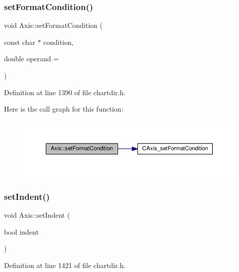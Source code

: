 \subsubsection{\texorpdfstring{set\+Format\+Condition()}{setFormatCondition()}}
{\footnotesize\ttfamily void Axis\+::set\+Format\+Condition (\begin{DoxyParamCaption}\item[{const char $\ast$}]{condition,  }\item[{double}]{operand = {} }\end{DoxyParamCaption})\hspace{0.3cm}{\ttfamily [inline]}}



Definition at line 1390 of file chartdir.\+h.

Here is the call graph for this function\+:
\nopagebreak
\begin{figure}[H]
\begin{center}
\leavevmode
\includegraphics[width=350pt]{class_axis_aa73c26b4400fa61689f924fcea85c97e_cgraph}
\end{center}
\end{figure}
\mbox{\label{class_axis_a906b0e90dca1e327107739ed120bec67}} 
\subsubsection{\texorpdfstring{set\+Indent()}{setIndent()}}
{\footnotesize\ttfamily void Axis\+::set\+Indent (\begin{DoxyParamCaption}\item[{bool}]{indent }\end{DoxyParamCaption})\hspace{0.3cm}{\ttfamily [inline]}}



Definition at line 1421 of file chartdir.\+h.

